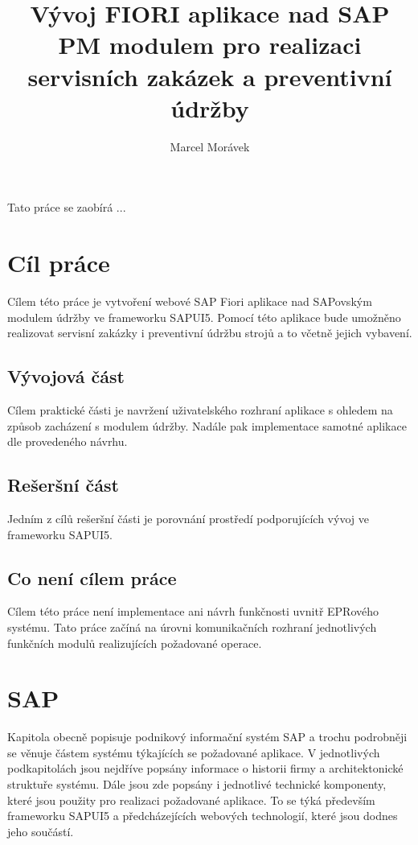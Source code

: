 \documentclass[thesis=M,czech]{FITthesis}[2012/06/26]
\title{Vývoj FIORI aplikace nad SAP PM modulem pro realizaci servisních zakázek a preventivní údržby}
\author{Marcel Morávek} %
\begin{document}

\begin{introduction}
	Tato práce se zaobírá ...
\end{introduction}

\chapter{Cíl práce}
Cílem této práce je vytvoření webové SAP Fiori aplikace nad SAPovským modulem údržby ve frameworku SAPUI5. Pomocí této aplikace bude umožněno realizovat servisní zakázky i preventivní údržbu strojů a to včetně jejich vybavení.

\section{Vývojová část}
Cílem praktické části je navržení uživatelského rozhraní aplikace s ohledem na způsob zacházení s modulem údržby. Nadále pak implementace samotné aplikace dle provedeného návrhu. 

\section{Rešeršní část}
Jedním z cílů rešeršní části je porovnání prostředí podporujících vývoj ve frameworku SAPUI5. 

\section{Co není cílem práce}
Cílem této práce není implementace ani návrh funkčnosti uvnitř EPRového systému. Tato práce začíná na úrovni komunikačních rozhraní jednotlivých funkčních modulů realizujících požadované operace. 

\chapter{SAP}
Kapitola obecně popisuje podnikový informační systém SAP a trochu podrobněji se věnuje částem systému týkajících se požadované aplikace. V jednotlivých podkapitolách jsou nejdříve popsány informace o historii firmy a architektonické struktuře systému. Dále jsou zde popsány i jednotlivé technické komponenty, které jsou použity pro realizaci požadované aplikace. To se týká především frameworku SAPUI5 a předcházejících webových technologií, které jsou dodnes jeho součástí.
\end{document}
